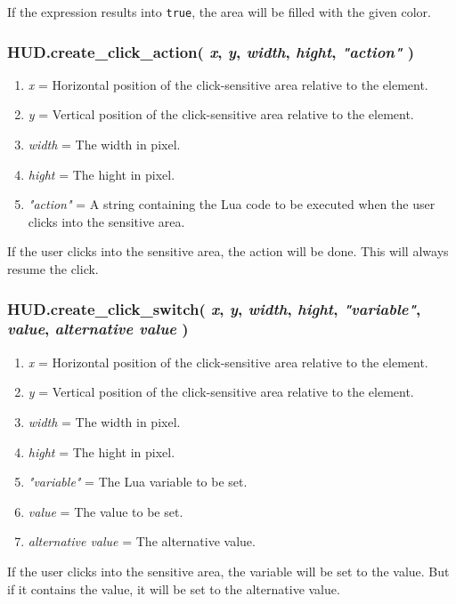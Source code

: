 \documentclass[11pt,parskip=half,a4paper]{scrartcl}
\begin{document}
If the expression results into \verb|true|, the area will be filled with the given color.

\subsubsection{HUD.create\_click\_action( \emph{x}, \emph{y}, \emph{width}, \emph{hight}, \emph{"action"} )}

\begin{enumerate}
	\item \emph{x} = Horizontal position of the click-sensitive area relative to the element.
	\item \emph{y} = Vertical position of the click-sensitive area relative to the element.
	\item \emph{width} = The width in pixel.
	\item \emph{hight} = The hight in pixel.
	\item \emph{"action"} = A string containing the Lua code to be executed when the user clicks into the sensitive area.
\end{enumerate}

If the user clicks into the sensitive area, the action will be done. This will always resume the click.

\subsubsection{HUD.create\_click\_switch( \emph{x}, \emph{y}, \emph{width}, \emph{hight}, \emph{"variable"}, \emph{value}, \emph{alternative value} )}

\begin{enumerate}
	\item \emph{x} = Horizontal position of the click-sensitive area relative to the element.
	\item \emph{y} = Vertical position of the click-sensitive area relative to the element.
	\item \emph{width} = The width in pixel.
	\item \emph{hight} = The hight in pixel.
	\item \emph{"variable"} = The Lua variable to be set.
	\item \emph{value} = The value to be set.
	\item \emph{alternative value} = The alternative value.
\end{enumerate}

If the user clicks into the sensitive area, the variable will be set to the value. But if it contains the value, it will be set to the alternative value.
\end{document}
